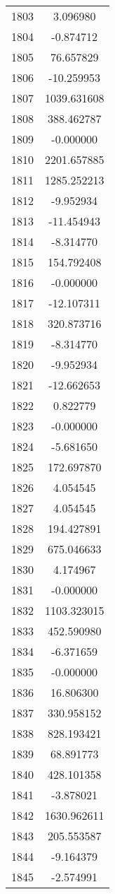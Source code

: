 \documentclass[12pt]{article}
\begin{document}
\begin{longtable}{@{}cc@{}}
1803 & 3.096980 \\
1804 & -0.874712 \\
1805 & 76.657829 \\
1806 & -10.259953 \\
1807 & 1039.631608 \\
1808 & 388.462787 \\
1809 & -0.000000 \\
1810 & 2201.657885 \\
1811 & 1285.252213 \\
1812 & -9.952934 \\
1813 & -11.454943 \\
1814 & -8.314770 \\
1815 & 154.792408 \\
1816 & -0.000000 \\
1817 & -12.107311 \\
1818 & 320.873716 \\
1819 & -8.314770 \\
1820 & -9.952934 \\
1821 & -12.662653 \\
1822 & 0.822779 \\
1823 & -0.000000 \\
1824 & -5.681650 \\
1825 & 172.697870 \\
1826 & 4.054545 \\
1827 & 4.054545 \\
1828 & 194.427891 \\
1829 & 675.046633 \\
1830 & 4.174967 \\
1831 & -0.000000 \\
1832 & 1103.323015 \\
1833 & 452.590980 \\
1834 & -6.371659 \\
1835 & -0.000000 \\
1836 & 16.806300 \\
1837 & 330.958152 \\
1838 & 828.193421 \\
1839 & 68.891773 \\
1840 & 428.101358 \\
1841 & -3.878021 \\
1842 & 1630.962611 \\
1843 & 205.553587 \\
1844 & -9.164379 \\
1845 & -2.574991 \\

\end{longtable}
\end{document}
